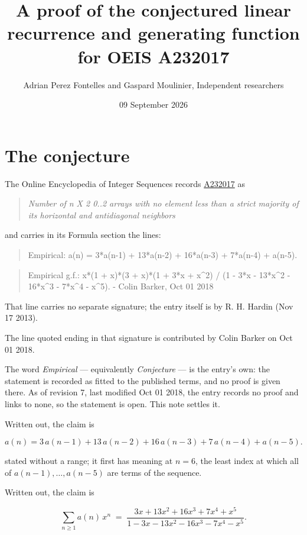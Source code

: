 \documentclass[11pt]{article}
\title{A proof of the conjectured linear recurrence and generating function for OEIS A232017}
\author{Adrian Perez Fontelles and Gaspard Moulinier, Independent researchers}
\date{09 September 2026}
\theoremstyle{definition}
\begin{document}
\maketitle
\section{The conjecture}

The Online Encyclopedia of Integer Sequences records \href{https://oeis.org/A232017}{A232017} as

\begin{quote}\itshape Number of n X 2 0..2 arrays with no element less than a strict majority of its horizontal and antidiagonal neighbors\end{quote}

and carries in its Formula section the lines:

\begin{quote}\ttfamily Empirical: a(n) = 3*a(n-1) + 13*a(n-2) + 16*a(n-3) + 7*a(n-4) + a(n-5).\end{quote}

\begin{quote}\ttfamily Empirical g.f.: x*(1 + x)*(3 + x)*(1 + 3*x + x\textasciicircum{}2) / (1 - 3*x - 13*x\textasciicircum{}2 - 16*x\textasciicircum{}3 - 7*x\textasciicircum{}4 - x\textasciicircum{}5). - Colin Barker, Oct 01 2018\end{quote}

That line carries no separate signature; the entry itself is by R. H. Hardin (Nov 17 2013).

The line quoted ending in that signature is contributed by Colin Barker on Oct 01 2018.

The word {\itshape Empirical} --- equivalently {\itshape Conjecture} --- is the entry's own: the statement is recorded as fitted to the published terms, and no proof is given there. As of revision 7, last modified Oct 01 2018, the entry records no proof and links to none, so the statement is open. This note settles it.

Written out, the claim is

\[a(n) = 3\,a(n-1) + 13\,a(n-2) + 16\,a(n-3) + 7\,a(n-4) + a(n-5).\]

stated without a range; it first has meaning at $n = 6$, the least index at which all of $a(n-1),\dots,a(n-5)$ are terms of the sequence.

Written out, the claim is

\[\sum_{n \ge 1} a(n)\,x^n \;=\; \frac{3x + 13x^{2} + 16x^{3} + 7x^{4} + x^{5}}{1 - 3x - 13x^{2} - 16x^{3} - 7x^{4} - x^{5}}.\]
\end{document}
